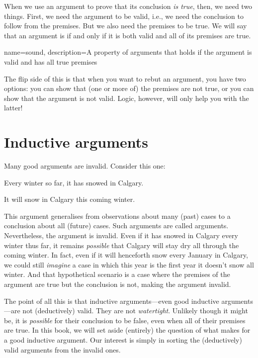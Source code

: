 When we use an argument to prove that its conclusion \emph{is true}, then, we need two things. First, we need the argument to be valid, i.e., we need the conclusion to follow from the premises. But we also need the premises to be true. We will say that an argument is  if and only if it is both valid and all of its premises are true.

{
name=sound,
description={A property of arguments that holds if the argument is valid and has all true premises}
}

The flip side of this is that when you want to rebut an argument, you have two options: you can show that (one or more of) the premises are not true, or you can show that the argument is not valid.  Logic, however, will only help you with the latter!  

\section{Inductive arguments}

Many good arguments are invalid. Consider this one:
	\begin{earg}
		\item[] Every winter so far, it has snowed in Calgary.
	\item[\therefore] It will snow in Calgary this coming winter.
\end{earg}
This argument generalises from observations about many (past) cases to a conclusion about all (future) cases. Such arguments are called  arguments. Nevertheless, the argument is invalid. Even if it has snowed in Calgary every winter thus far, it remains \emph{possible} that Calgary will stay dry all through the coming winter. In fact, even if it will henceforth snow every January in Calgary, we could still \emph{imagine} a case in which this year is the first year it doesn't snow all winter. And that hypothetical scenario is a case where the premises of the argument are true but the conclusion is not, making the argument invalid.

The point of all this is that inductive arguments---even good inductive arguments---are not (deductively) valid. They are not \emph{watertight}. Unlikely though it might be, it is \emph{possible} for their conclusion to be false, even when all of their premises are true. In this book, we will set aside (entirely) the question of what makes for a good inductive argument. Our interest is simply in sorting the (deductively) valid arguments from the invalid ones.  

